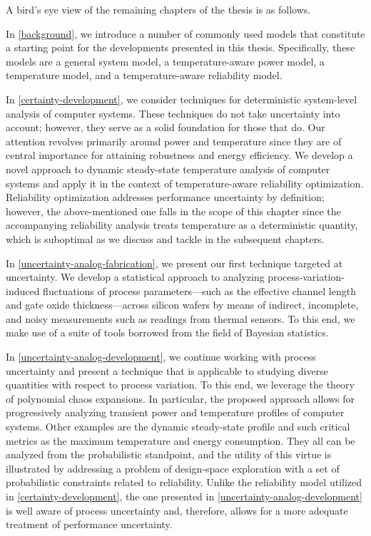 A bird's eye view of the remaining chapters of the thesis is as follows.

In \cref{background}, we introduce a number of commonly used models that
constitute a starting point for the developments presented in this thesis.
Specifically, these models are a general system model, a temperature-aware power
model, a temperature model, and a temperature-aware reliability model.

In \cref{certainty-development}, we consider techniques for deterministic
system-level analysis of computer systems. These techniques do not take
uncertainty into account; however, they serve as a solid foundation for those
that do. Our attention revolves primarily around power and temperature since
they are of central importance for attaining robustness and energy efficiency.
We develop a novel approach to dynamic steady-state temperature analysis of
computer systems and apply it in the context of temperature-aware reliability
optimization. Reliability optimization addresses performance uncertainty by
definition; however, the above-mentioned one falls in the scope of this chapter
since the accompanying reliability analysis treats temperature as a
deterministic quantity, which is suboptimal as we discuss and tackle in the
subsequent chapters.

In \cref{uncertainty-analog-fabrication}, we present our first technique
targeted at uncertainty. We develop a statistical approach to analyzing
process-variation-induced fluctuations of process parameters---such as the
effective channel length and gate oxide thickness---across silicon wafers by
means of indirect, incomplete, and noisy measurements such as readings from
thermal sensors. To this end, we make use of a suite of tools borrowed from the
field of Bayesian statistics.

In \cref{uncertainty-analog-development}, we continue working with process
uncertainty and present a technique that is applicable to studying diverse
quantities with respect to process variation. To this end, we leverage the
theory of polynomial chaos expansions. In particular, the proposed approach
allows for progressively analyzing transient power and temperature profiles of
computer systems. Other examples are the dynamic steady-state profile and such
critical metrics as the maximum temperature and energy consumption. They all can
be analyzed from the probabilistic standpoint, and the utility of this virtue is
illustrated by addressing a problem of design-space exploration with a set of
probabilistic constraints related to reliability. Unlike the reliability model
utilized in \cref{certainty-development}, the one presented in
\cref{uncertainty-analog-development} is well aware of process uncertainty and,
therefore, allows for a more adequate treatment of performance uncertainty.

